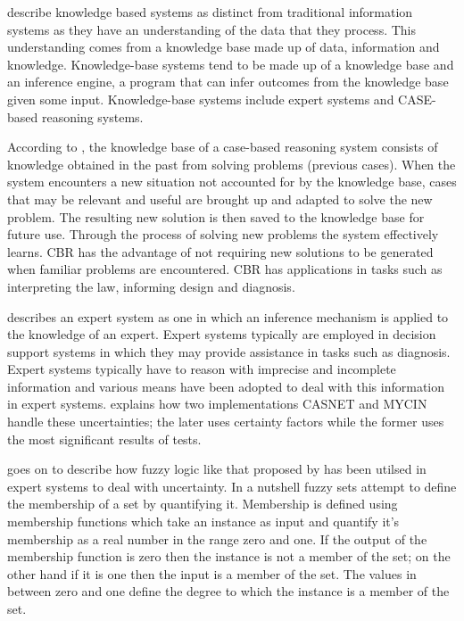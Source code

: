 \cite{akerkar2010knowledge} describe knowledge based systems as distinct from traditional information systems as they have an understanding of the data that they process. This understanding comes from a knowledge base made up of data, information and knowledge. Knowledge-base systems tend to be made up of a knowledge base and an inference engine, a program that can infer outcomes from the knowledge base given some input. Knowledge-base systems include expert systems and CASE-based reasoning systems. 

According to \cite{leake2003case}, the knowledge base of a case-based reasoning system consists of knowledge obtained in the past from solving problems (previous cases). When the system encounters a new situation not accounted for by the knowledge base, cases that may be relevant and useful are brought up and adapted to solve the new problem. The resulting new solution is then saved to the knowledge base for future use. Through the process of solving new problems the system effectively learns. CBR has the advantage of not requiring new solutions to be generated when familiar problems are encountered. CBR has applications in tasks such as interpreting the law, informing design and diagnosis.

\cite{todd1992introduction} describes an expert system as one in which an inference mechanism is applied to the knowledge of an expert. Expert systems typically are employed in decision support systems in which they may provide assistance in tasks such as diagnosis. Expert systems typically have to reason with imprecise and incomplete information and various means have been adopted to deal with this information in expert systems. \cite{kandel1991fuzzy} explains how two implementations CASNET and MYCIN handle these uncertainties; the later uses certainty factors while the former uses the most significant results of tests.

\cite{kandel1991fuzzy} goes on to describe how fuzzy logic like that proposed by \cite{zadeh1965fuzzy} has been utilsed in expert systems to deal with uncertainty. In a nutshell fuzzy sets attempt to define the membership of a set by quantifying it. Membership is defined using membership functions which take an instance as input and quantify it's membership as a real number in the range zero and one. If the output of the membership function is zero then the instance is not a member of the set; on the other hand if it is one then the input is a member of the set. The values in between zero and one define the degree to which the instance is a member of the set.


